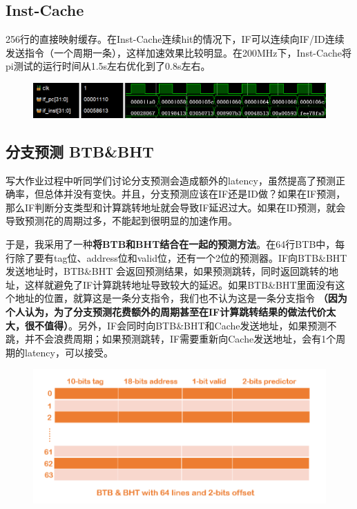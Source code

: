 \documentclass[a4paper,UTF8]{article}
\begin{document}
\subsection{Inst-Cache}
256行的直接映射缓存。在Inst-Cache连续hit的情况下，IF可以连续向IF/ID连续发送指令（一个周期一条），这样加速效果比较明显。在200MHz下，Inst-Cache将pi测试的运行时间从1.5s左右优化到了0.8s左右。
\begin{figure}[h]
    \centering
	\includegraphics[width=1\linewidth]{4.png}
\end{figure}

\subsection{分支预测 BTB\&BHT}
写大作业过程中听同学们讨论分支预测会造成额外的latency，虽然提高了预测正确率，但总体并没有变快。并且，分支预测应该在IF还是ID做？如果在IF预测，那么IF判断分支类型和计算跳转地址就会导致IF延迟过大。如果在ID预测，就会导致预测花的周期过多，不能起到很明显的加速作用。

于是，我采用了一种\textbf{将BTB和BHT结合在一起的预测方法}。在64行BTB中，每行除了要有tag位、address位和valid位，还有一个2位的预测器。IF向BTB\&BHT发送地址时，BTB\&BHT 会返回预测结果，如果预测跳转，同时返回跳转的地址，这样就避免了IF计算跳转地址导致较大的延迟。如果BTB\&BHT里面没有这个地址的位置，就算这是一条分支指令，我们也不认为这是一条分支指令
\textbf{（因为个人认为，为了分支预测花费额外的周期甚至在IF计算跳转结果的做法代价太大，很不值得）}。另外，IF会同时向BTB\&BHT和Cache发送地址，如果预测不跳，并不会浪费周期；如果预测跳转，IF需要重新向Cache发送地址，会有1个周期的latency，可以接受。
\begin{figure}[h]
    \centering
	\includegraphics[width=1\linewidth]{2.png}
\end{figure}
\end{document}
